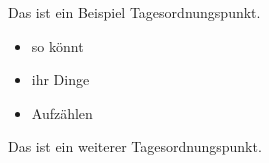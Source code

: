 

Das ist ein Beispiel Tagesordnungspunkt.

\begin{itemize}
  \item so könnt 
  \item ihr Dinge 
  \item Aufzählen 
\end{itemize}



Das ist ein weiterer Tagesordnungspunkt.
